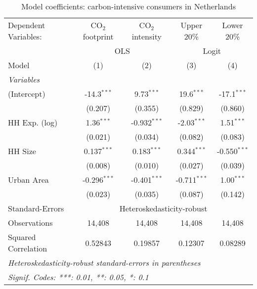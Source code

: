 
\begin{table}[htbp!]
   \centering
   \small
   \begin{adjustbox}{width = 1\textwidth, max height = 0.95\textheight, center}
      \begin{threeparttable}[b]
         \caption{\label{tab:Logit_1_NLD} Model coefficients: carbon-intensive consumers in Netherlands}
         \begin{tabular}{lcccc}
            \tabularnewline \midrule \midrule
            Dependent Variables: & CO$_{2}$ footprint & CO$_{2}$ intensity & Upper 20\%     & Lower 20\%\\   
             & \multicolumn{2}{c}{OLS} & \multicolumn{2}{c}{Logit} \\ 
            Model                & (1)                & (2)                & (3)            & (4)\\  
            \midrule
            \emph{Variables}\\
            (Intercept)          & -14.3$^{***}$      & 9.73$^{***}$       & 19.6$^{***}$   & -17.1$^{***}$\\   
                                 & (0.207)            & (0.355)            & (0.829)        & (0.860)\\   
            HH Exp. (log)        & 1.36$^{***}$       & -0.932$^{***}$     & -2.03$^{***}$  & 1.51$^{***}$\\   
                                 & (0.021)            & (0.034)            & (0.082)        & (0.083)\\   
            HH Size              & 0.137$^{***}$      & 0.183$^{***}$      & 0.344$^{***}$  & -0.550$^{***}$\\   
                                 & (0.008)            & (0.010)            & (0.027)        & (0.039)\\   
            Urban Area           & -0.296$^{***}$     & -0.401$^{***}$     & -0.711$^{***}$ & 1.00$^{***}$\\   
                                 & (0.023)            & (0.035)            & (0.087)        & (0.142)\\   
            \midrule 
            Standard-Errors & \multicolumn{4}{c}{Heteroskedasticity-robust} \\ 
            Observations         & 14,408             & 14,408             & 14,408         & 14,408\\  
            Squared Correlation  & 0.52843            & 0.19857            & 0.12307        & 0.08289\\  
            \midrule \midrule
            \multicolumn{5}{l}{\emph{Heteroskedasticity-robust standard-errors in parentheses}}\\
            \multicolumn{5}{l}{\emph{Signif. Codes: ***: 0.01, **: 0.05, *: 0.1}}\\
         \end{tabular}
         

\end{threeparttable}
\end{adjustbox}
\end{table}
